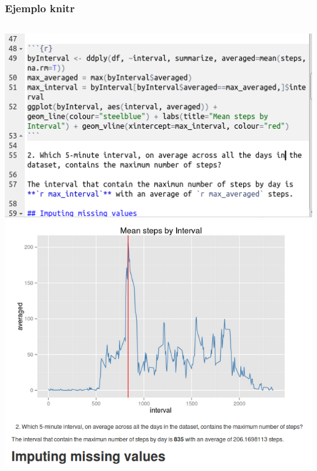 \documentclass[sans serif,9pt,xcolor=dvipsnames]{beamer}%
\begin{document}
\begin{frame}
\frametitle{Ejemplo knitr}
\begin{columns}
 \hspace{1cm}
\includegraphics[scale=0.3]{imagenes/rmd_input.png} 
\includegraphics[scale=0.24]{imagenes/rmd_output.png} 
\end{columns}
\end{frame}
\end{document}
